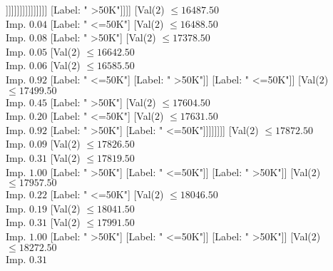 \documentclass[margin=10pt]{standalone}
\begin{document}
\begin{forest}
																															[Label: " >50K"]
																															[Val($2$) $ \leq 16289.50$ \\ Imp. $0.32$
																																[Label: " <=50K"]
																																[Val($2$) $ \leq 16297.50$ \\ Imp. $1.00$
																																	[Label: " >50K"]
																																	[Label: " <=50K"]]]]]]]]]]]]]]]]
																		[Label: " >50K"]]]]
															[Val($2$) $ \leq 16487.50$ \\ Imp. $0.04$
																[Label: " <=50K"]
																[Val($2$) $ \leq 16488.50$ \\ Imp. $0.08$
																	[Label: " >50K"]
																	[Val($2$) $ \leq 17378.50$ \\ Imp. $0.05$
																		[Val($2$) $ \leq 16642.50$ \\ Imp. $0.06$
																			[Val($2$) $ \leq 16585.50$ \\ Imp. $0.92$
																				[Label: " <=50K"]
																				[Label: " >50K"]]
																			[Label: " <=50K"]]
																		[Val($2$) $ \leq 17499.50$ \\ Imp. $0.45$
																			[Label: " >50K"]
																			[Val($2$) $ \leq 17604.50$ \\ Imp. $0.20$
																				[Label: " <=50K"]
																				[Val($2$) $ \leq 17631.50$ \\ Imp. $0.92$
																					[Label: " >50K"]
																					[Label: " <=50K"]]]]]]]]
														[Val($2$) $ \leq 17872.50$ \\ Imp. $0.09$
															[Val($2$) $ \leq 17826.50$ \\ Imp. $0.31$
																[Val($2$) $ \leq 17819.50$ \\ Imp. $1.00$
																	[Label: " >50K"]
																	[Label: " <=50K"]]
																[Label: " >50K"]]
															[Val($2$) $ \leq 17957.50$ \\ Imp. $0.22$
																[Label: " <=50K"]
																[Val($2$) $ \leq 18046.50$ \\ Imp. $0.19$
																	[Val($2$) $ \leq 18041.50$ \\ Imp. $0.31$
																		[Val($2$) $ \leq 17991.50$ \\ Imp. $1.00$
																			[Label: " >50K"]
																			[Label: " <=50K"]]
																		[Label: " >50K"]]
																	[Val($2$) $ \leq 18272.50$ \\ Imp. $0.31$

\end{forest}
\end{document}
